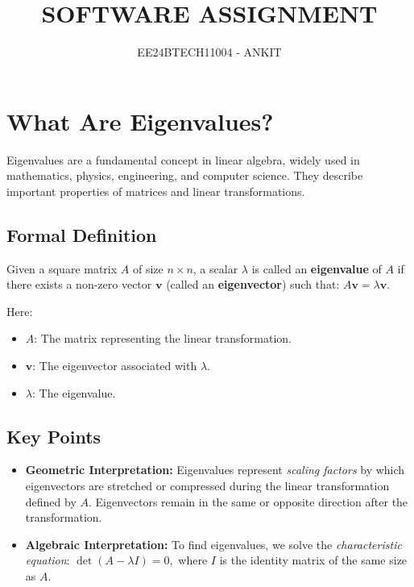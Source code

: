 \documentclass[12pt]{article}
\title{SOFTWARE ASSIGNMENT}
\author{EE24BTECH11004 - ANKIT}
\begin{document}
\maketitle

\section{What Are Eigenvalues?}

Eigenvalues are a fundamental concept in linear algebra, widely used in mathematics, physics, engineering, and computer science. They describe important properties of matrices and linear transformations.

\subsection{Formal Definition}

Given a square matrix $A$ of size $n \times n$, a scalar $\lambda$ is called an \textbf{eigenvalue} of $A$ if there exists a non-zero vector $\mathbf{v}$ (called an \textbf{eigenvector}) such that:
$A \mathbf{v} = \lambda \mathbf{v}.$

Here:
\begin{itemize}
    \item $A$: The matrix representing the linear transformation.
    \item $\mathbf{v}$: The eigenvector associated with $\lambda$.
    \item $\lambda$: The eigenvalue.
\end{itemize}

\subsection{Key Points}
\begin{itemize}
    \item \textbf{Geometric Interpretation:}
    Eigenvalues represent \textit{scaling factors} by which eigenvectors are stretched or compressed during the linear transformation defined by $A$. Eigenvectors remain in the same or opposite direction after the transformation.
    
    \item \textbf{Algebraic Interpretation:}
    To find eigenvalues, we solve the \textit{characteristic equation}:
    $\det(A - \lambda I) = 0,$
    where $I$ is the identity matrix of the same size as $A$.
\end{itemize}
\end{document}
